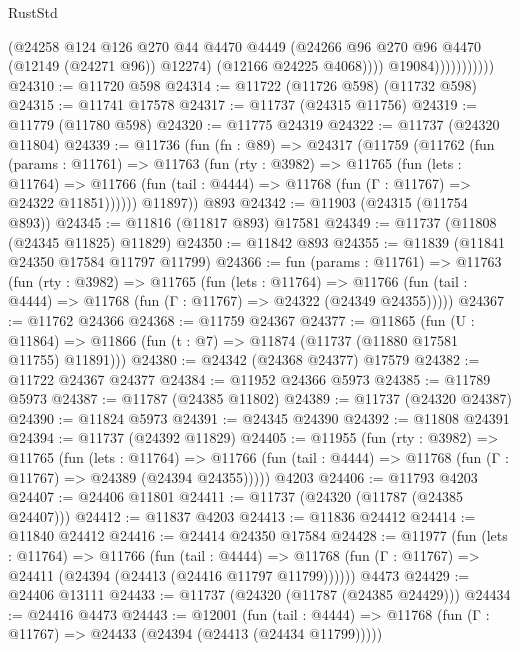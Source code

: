 \begin{lexlean}{RustStd}
\begin{coremodule}
                              (@24258
                                @124
                                @126
                                @270
                                @44
                                @4470
                                @4449
                                (@24266 @96 @270 @96 @4470 (@12149 (@24271 @96)) @12274)
                                (@12166 @24225 @4068))))
                          @19084)))))))))))
@24310 := @11720 @598
@24314 := @11722 (@11726 @598) (@11732 @598)
@24315 := @11741 @17578
@24317 := @11737 (@24315 @11756)
@24319 := @11779 (@11780 @598)
@24320 := @11775 @24319
@24322 := @11737 (@24320 @11804)
@24339 := @11736
    (fun (fn : @89) =>
    @24317
      (@11759
        (@11762
          (fun (params : @11761) =>
          @11763
            (fun (rty : @3982) =>
            @11765
              (fun (lets : @11764) =>
              @11766 (fun (tail : @4444) => @11768 (fun (Γ : @11767) => @24322 @11851))))))
        @11897))
    @893
@24342 := @11903 (@24315 (@11754 @893))
@24345 := @11816 (@11817 @893) @17581
@24349 := @11737 (@11808 (@24345 @11825) @11829)
@24350 := @11842 @893
@24355 := @11839 (@11841 @24350 @17584 @11797 @11799)
@24366 := fun (params : @11761) =>
  @11763
    (fun (rty : @3982) =>
    @11765
      (fun (lets : @11764) =>
      @11766 (fun (tail : @4444) => @11768 (fun (Γ : @11767) => @24322 (@24349 @24355)))))
@24367 := @11762 @24366
@24368 := @11759 @24367
@24377 := @11865
    (fun (U : @11864) => @11866 (fun (t : @7) => @11874 (@11737 (@11880 @17581 @11755) @11891)))
@24380 := @24342 (@24368 @24377) @17579
@24382 := @11722 @24367 @24377
@24384 := @11952 @24366 @5973
@24385 := @11789 @5973
@24387 := @11787 (@24385 @11802)
@24389 := @11737 (@24320 @24387)
@24390 := @11824 @5973
@24391 := @24345 @24390
@24392 := @11808 @24391
@24394 := @11737 (@24392 @11829)
@24405 := @11955
    (fun (rty : @3982) =>
    @11765
      (fun (lets : @11764) =>
      @11766 (fun (tail : @4444) => @11768 (fun (Γ : @11767) => @24389 (@24394 @24355)))))
    @4203
@24406 := @11793 @4203
@24407 := @24406 @11801
@24411 := @11737 (@24320 (@11787 (@24385 @24407)))
@24412 := @11837 @4203
@24413 := @11836 @24412
@24414 := @11840 @24412
@24416 := @24414 @24350 @17584
@24428 := @11977
    (fun (lets : @11764) =>
    @11766
      (fun (tail : @4444) =>
      @11768 (fun (Γ : @11767) => @24411 (@24394 (@24413 (@24416 @11797 @11799))))))
    @4473
@24429 := @24406 @13111
@24433 := @11737 (@24320 (@11787 (@24385 @24429)))
@24434 := @24416 @4473
@24443 := @12001
    (fun (tail : @4444) => @11768 (fun (Γ : @11767) => @24433 (@24394 (@24413 (@24434 @11799)))))

\end{coremodule}
\end{lexlean}
